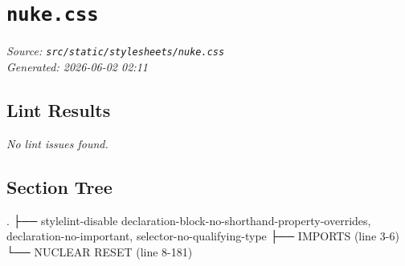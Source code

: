 
\section{\texttt{nuke.css}}
\textit{Source: \texttt{src/static/stylesheets/nuke.css}} \\
\textit{Generated: 2026-06-02 02:11} \\

\subsection{Lint Results}
\textit{No lint issues found.} \\

\subsection{Section Tree}
\begingroup
\linespread{0.9}\selectfont
\begin{verbnobox}[\FiraCode]
.
├── stylelint-disable declaration-block-no-shorthand-property-overrides, declaration-no-important, selector-no-qualifying-type
├── IMPORTS  (line 3-6)
└── NUCLEAR RESET  (line 8-181)
\end{verbnobox}
\endgroup
